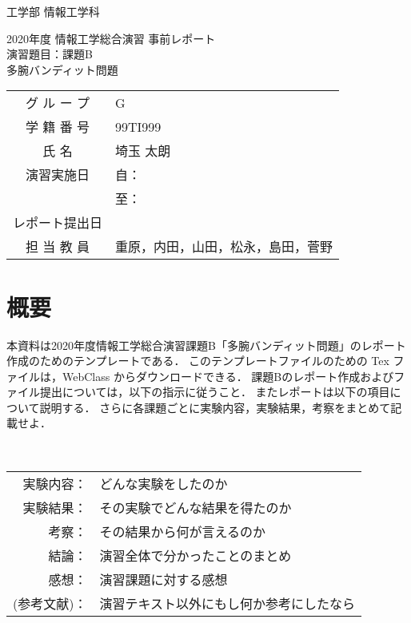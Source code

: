 \documentclass[10pt,a4paper,dvipdfmx]{jsarticle}%
\begin{document}
\begin{titlepage}
	\begin{flushleft}
	{\Large 工学部 情報工学科}
	\end{flushleft}
	\vspace{100pt}
	\begin{center}
		{\huge 2020年度 情報工学総合演習 事前レポート}\\
		\vspace{40pt}
		{\huge 演習題目：課題B}\\ \vspace{10pt}
		{\huge 多腕バンディット問題}\\
		\vspace{100pt}
		\begin{table}[hp]
			\centering \LARGE
			\begin{tabular}{cl}
				グ ル ー プ    & G \\
				学 籍 番 号    & 99TI999 \\
				氏 名          & 埼玉 太朗 \\
				演習実施日     & 自： \\
				               & 至： \\
				レポート提出日 &  \\
				担 当 教 員 & 重原，内田，山田，松永，島田，菅野 \\
			\end{tabular}
		\end{table}
		\vfill
	\end{center}
\end{titlepage}
\newpage

\section{概要}

本資料は2020年度情報工学総合演習課題B「多腕バンディット問題」のレポート作成のためのテンプレートである．
このテンプレートファイルのための Tex ファイルは，WebClass からダウンロードできる．
課題Bのレポート作成およびファイル提出については，以下の指示に従うこと．
またレポートは以下の項目について説明する．
さらに各課題ごとに実験内容，実験結果，考察をまとめて記載せよ．

\ \
\begin{center}
\parbox{30zw}{%
\begin{tabular}[t]{rl}
 実験内容：& どんな実験をしたのか\\
 実験結果：& その実験でどんな結果を得たのか\\
 考察：& その結果から何が言えるのか\\
 結論：& 演習全体で分かったことのまとめ\\
 感想：& 演習課題に対する感想\\
 (参考文献)：& 演習テキスト以外にもし何か参考にしたなら\\
\end{tabular}
}
\end{center}
\end{document}
